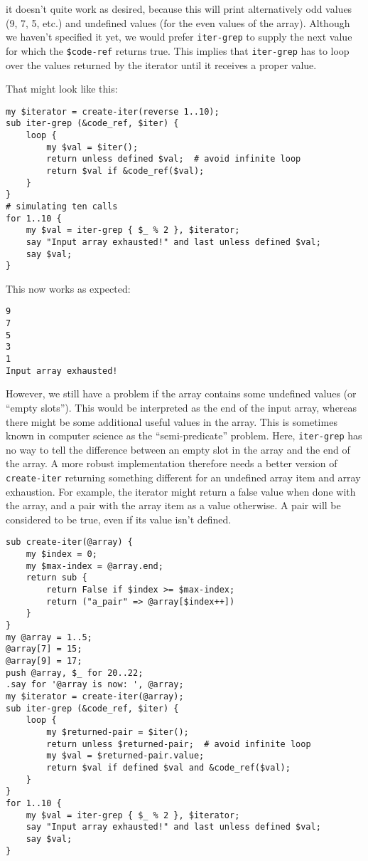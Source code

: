 it doesn't quite work as desired, because this will print 
alternatively odd values (9, 7, 5, etc.) and undefined 
values (for the even values of the array). Although we 
haven't specified it yet, we would prefer {\tt iter-grep} 
to supply the next value for which the \verb'$code-ref' 
returns true. This implies that {\tt iter-grep} has to 
loop over the values returned by the iterator until it 
receives a proper value.

That might look like this:

\begin{verbatim}
my $iterator = create-iter(reverse 1..10);
sub iter-grep (&code_ref, $iter) {
	loop {
		my $val = $iter();
		return unless defined $val;  # avoid infinite loop
	    return $val if &code_ref($val);
	}
}
# simulating ten calls
for 1..10 {
	my $val = iter-grep { $_ % 2 }, $iterator;
	say "Input array exhausted!" and last unless defined $val;
	say $val;
}
\end{verbatim}

This now works as expected:

\begin{verbatim}
9
7
5
3
1
Input array exhausted!
\end{verbatim}

However, we still have a problem if the array 
contains some undefined values (or ``empty slots''). This 
would be interpreted as the end of the input array, whereas 
there might be some additional useful values in the array. 
This is sometimes known in computer science as the 
``semi-predicate'' problem. Here, {\tt iter-grep} has no 
way to tell the difference between an empty slot in the array 
and the end of the array. A more robust implementation 
therefore needs a better version of {\tt create-iter}  
returning something different for an undefined array item 
and array exhaustion. For example, the iterator might return 
a false value when done with the array, and a pair with the 
array item as a value otherwise. A pair will be considered 
to be true, even if its value isn't defined. 

\begin{verbatim}
sub create-iter(@array) {
    my $index = 0;
    my $max-index = @array.end;
    return sub { 
    	return False if $index >= $max-index; 
        return ("a_pair" => @array[$index++]) 
    }
}
my @array = 1..5;
@array[7] = 15;
@array[9] = 17;
push @array, $_ for 20..22;
.say for '@array is now: ', @array;
my $iterator = create-iter(@array);
sub iter-grep (&code_ref, $iter) {
	loop {
		my $returned-pair = $iter();
		return unless $returned-pair;  # avoid infinite loop
		my $val = $returned-pair.value;
	    return $val if defined $val and &code_ref($val);
	}
}
for 1..10 {
	my $val = iter-grep { $_ % 2 }, $iterator;
	say "Input array exhausted!" and last unless defined $val;
	say $val;
}
\end{verbatim}


